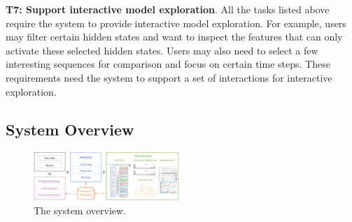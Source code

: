 \textbf{T7: Support interactive model exploration}.
All the tasks listed above require the system to provide interactive model exploration.
For example, users may filter certain hidden states and want to inspect the features that can only activate these selected hidden states.
Users may also need to select a few interesting sequences for comparison and focus on certain time steps.
These requirements need the system to support a set of interactions for interactive exploration.

\subsection{System Overview}

\begin{figure}[t]
	\centering
    \includegraphics[width=0.49\textwidth]{pictures/System_framework.pdf}
	\vspace{-3mm}
	\caption{The system overview. 
	}
	\label{fig:system_framework}
	\vspace{-4mm}
\end{figure}


